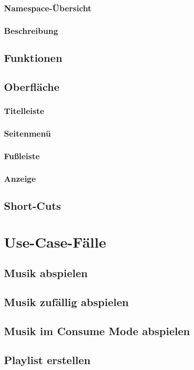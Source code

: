 \subsubsection{Namespace-Übersicht}
\subsubsection{Beschreibung}
\subsection{Funktionen}
\subsection{Oberfläche}
\subsubsection{Titelleiste}
\subsubsection{Seitenmenü}
\subsubsection{Fußleiste}
\subsubsection{Anzeige}
\subsection{Short-Cuts}
\section{Use-Case-Fälle}
\subsection{Musik abspielen}
\subsection{Musik zufällig abspielen}
\subsection{Musik im Consume Mode abspielen}
\subsection{Playlist erstellen}

